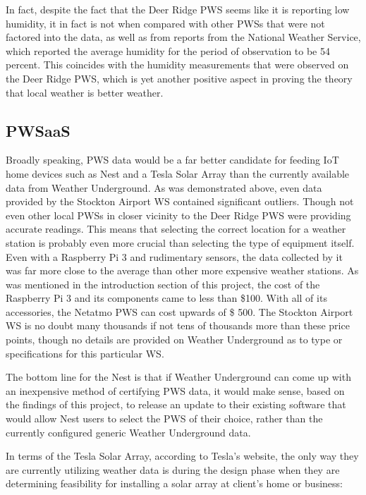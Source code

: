 \documentclass[sigconf]{acmart}
\begin{document}
In fact, despite the fact that the Deer Ridge PWS seems like it is reporting low humidity, it in fact is not when compared with other PWSs that were not factored into the data, as well as from reports from the National Weather Service\cite{NWS2017}, which reported the average humidity for the period of observation to be 54 percent. This coincides with the humidity measurements that were observed on the Deer Ridge PWS, which is yet another positive aspect in proving the theory that local weather is better weather.

\subsection{PWSaaS}

Broadly speaking, PWS data would be a far better candidate for feeding IoT home devices such as Nest and a Tesla Solar Array than the currently available data from Weather Underground. As was demonstrated above, even data provided by the Stockton Airport WS contained significant outliers. Though not even other local PWSs in closer vicinity to the Deer Ridge PWS were providing accurate readings. This means that selecting the correct location for a weather station is probably even more crucial than selecting the type of equipment itself. Even with a Raspberry Pi 3 and rudimentary sensors, the data collected by it was far more close to the average than other more expensive weather stations. As was mentioned in the introduction section of this project, the cost of the Raspberry Pi 3 and its components came to less than \$100. With all of its accessories, the Netatmo PWS can cost upwards of \$ 500\cite{Netatmo2017}. The Stockton Airport WS is no doubt many thousands if not tens of thousands more than these price points, though no details are provided on Weather Underground as to type or specifications for this particular WS.

The bottom line for the Nest is that if Weather Underground can come up with an inexpensive method of certifying PWS data, it would make sense, based on the findings of this project, to release an update to their existing software that would allow Nest users to select the PWS of their choice, rather than the currently configured generic Weather Underground data. 

In terms of the Tesla Solar Array, according to Tesla's website, the only way they are currently utilizing weather data is during the design phase when they are determining feasibility for installing a solar array at client's home or business\cite{Tesla2017}:
\end{document}
